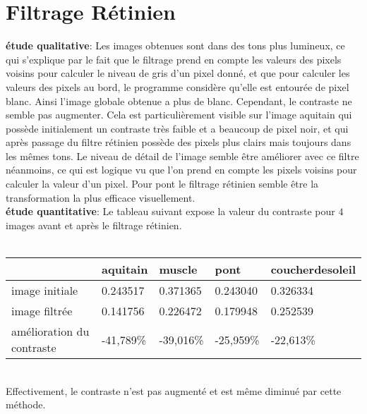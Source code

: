 \documentclass[12pt]{article}
\numberwithin{equation}{section}
\begin{document}
\section{Filtrage Rétinien}

\textbf{étude qualitative}: Les images obtenues sont dans des tons plus lumineux, ce qui s'explique par le fait que le filtrage prend en compte les valeurs des pixels voisins pour calculer le niveau de gris d'un pixel donné, et que pour calculer les valeurs des pixels au bord, le programme considère qu'elle est entourée de pixel blanc. Ainsi l'image globale obtenue a plus de blanc. Cependant, le contraste ne semble pas augmenter. Cela est particulièrement visible sur l'image aquitain qui possède initialement un contraste très faible et a beaucoup de pixel noir, et qui après passage du filtre rétinien possède des pixels plus clairs mais toujours dans les mêmes tons. Le niveau de détail de l'image semble être améliorer avec ce filtre néanmoins, ce qui est logique vu que l'on prend en compte les pixels voisins pour calculer la valeur d'un pixel. Pour pont le filtrage rétinien semble être la transformation la plus efficace visuellement.\\
\textbf{étude quantitative}: Le tableau suivant expose la valeur du contraste pour $4$ images avant et après le filtrage rétinien.\\\\
\begin{center}
  \begin{tabular}{|l|l|l|l|l|}
    \hline
    & aquitain & muscle & pont & coucherdesoleil\\
    \hline
    image initiale & 0.243517 & 0.371365 & 0.243040 & 0.326334\\
    \hline
    image filtrée & 0.141756 & 0.226472 & 0.179948 & 0.252539 \\
    \hline
    amélioration du contraste & -41,789\% & -39,016\% & -25,959\% &  -22,613\%\\
    \hline
  \end{tabular}
\end{center}
\\
Effectivement, le contraste n'est pas augmenté et est même diminué par cette méthode.
\end{document}
